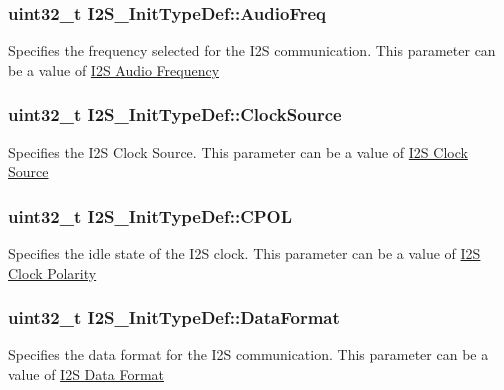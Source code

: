\subsubsection[{\texorpdfstring{Audio\+Freq}{AudioFreq}}]{\setlength{\rightskip}{0pt plus 5cm}uint32\+\_\+t I2\+S\+\_\+\+Init\+Type\+Def\+::\+Audio\+Freq}\hypertarget{struct_i2_s___init_type_def_a5c42be6d3eb4713f0d4fc202cae95553}{}\label{struct_i2_s___init_type_def_a5c42be6d3eb4713f0d4fc202cae95553}
Specifies the frequency selected for the I2S communication. This parameter can be a value of \hyperlink{group___i2_s___audio___frequency}{I2S Audio Frequency} 
\subsubsection[{\texorpdfstring{Clock\+Source}{ClockSource}}]{\setlength{\rightskip}{0pt plus 5cm}uint32\+\_\+t I2\+S\+\_\+\+Init\+Type\+Def\+::\+Clock\+Source}\hypertarget{struct_i2_s___init_type_def_a6a0c9c91b9530465cc2347c758a2fdf3}{}\label{struct_i2_s___init_type_def_a6a0c9c91b9530465cc2347c758a2fdf3}
Specifies the I2S Clock Source. This parameter can be a value of \hyperlink{group___i2_s___clock___source}{I2S Clock Source} 
\subsubsection[{\texorpdfstring{C\+P\+OL}{CPOL}}]{\setlength{\rightskip}{0pt plus 5cm}uint32\+\_\+t I2\+S\+\_\+\+Init\+Type\+Def\+::\+C\+P\+OL}\hypertarget{struct_i2_s___init_type_def_aff339ae5b4099da49e6970dd59c41afe}{}\label{struct_i2_s___init_type_def_aff339ae5b4099da49e6970dd59c41afe}
Specifies the idle state of the I2S clock. This parameter can be a value of \hyperlink{group___i2_s___clock___polarity}{I2S Clock Polarity} 
\subsubsection[{\texorpdfstring{Data\+Format}{DataFormat}}]{\setlength{\rightskip}{0pt plus 5cm}uint32\+\_\+t I2\+S\+\_\+\+Init\+Type\+Def\+::\+Data\+Format}\hypertarget{struct_i2_s___init_type_def_aa968e67a06e23282776bd7b615a8c1cc}{}\label{struct_i2_s___init_type_def_aa968e67a06e23282776bd7b615a8c1cc}
Specifies the data format for the I2S communication. This parameter can be a value of \hyperlink{group___i2_s___data___format}{I2S Data Format} 
